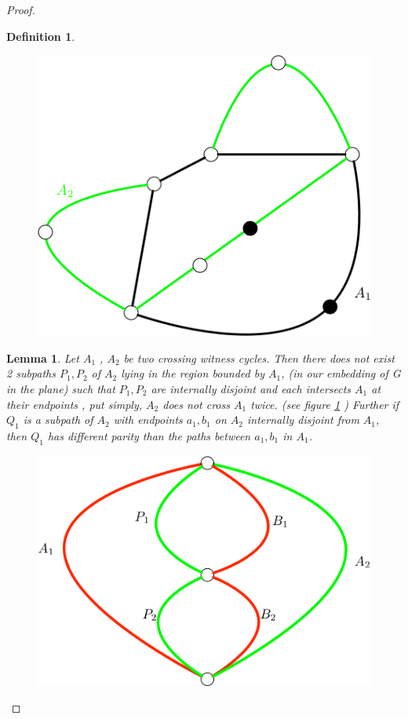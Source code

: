 \documentclass[letterpaper,11pt]{article}
\newtheorem{lemma}[theorem]{Lemma}
\newtheorem{definition}[theorem]{Definition}
\newcommand{\0}{\mathbb{0}}
\newcommand{\1}{\mathbb{1}}
\begin{document}
\begin{proof}
\begin{definition}
\begin{figure}
        \includegraphics[scale=0.3]{uncrossing2.png}
\end{figure}
\end{definition}

%
\begin{lemma}\label{singlecross}
Let $A_1$ , $A_2$  be two crossing witness cycles. Then there does not exist 2 subpaths $ P_1,  P_2 $ of $ A_2  $  lying in the region bounded  by $A_1$,  (in our embedding of G in the plane) such that $ P_1 , P_2  $ are internally disjoint and each intersects  $A_1$   at their endpoints
, put simply, $A_2$ does not cross $A_1$ twice. (see figure \ref{doublecross} )  Further if $Q_1$ is a subpath of $A_2$ with endpoints $a_1,b_1$ on $A_2$  internally disjoint from $A_1$, %
then $Q_1$ has different parity than the paths between $a_1, b_1 $ in $A_1$. %
\begin{figure}[h]
\includegraphics[scale=0.2]{DoubleCross.png}
\caption{}
\label{doublecross}
\end{figure}
\end{lemma}  


\end{proof}
\end{document}
